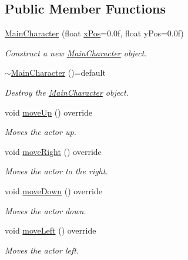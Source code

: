 \subsection*{Public Member Functions}
\begin{DoxyCompactItemize}
\item 
\mbox{\hyperlink{classRose_1_1Character_1_1MainCharacter_ad5de7cf93078abd4ee5439f29271517e}{Main\+Character}} (float \mbox{\hyperlink{classRose_1_1Character_1_1Actor_a0668a9c0c457d1c45e709b48111ba79d}{x\+Pos}}=0.\+0f, float y\+Pos=0.\+0f)
\begin{DoxyCompactList}\small\item\em Construct a new \mbox{\hyperlink{classRose_1_1Character_1_1MainCharacter}{Main\+Character}} object. \end{DoxyCompactList}\item 
\mbox{\hyperlink{classRose_1_1Character_1_1MainCharacter_ac608c6fc2c0b32d1fc93651939ee465e}{$\sim$\+Main\+Character}} ()=default
\begin{DoxyCompactList}\small\item\em Destroy the \mbox{\hyperlink{classRose_1_1Character_1_1MainCharacter}{Main\+Character}} object. \end{DoxyCompactList}\item 
void \mbox{\hyperlink{classRose_1_1Character_1_1MainCharacter_a9f967f5ad98eaae08948ab65bfd1a90b}{move\+Up}} () override
\begin{DoxyCompactList}\small\item\em Moves the actor up. \end{DoxyCompactList}\item 
void \mbox{\hyperlink{classRose_1_1Character_1_1MainCharacter_a08b5eae4f7ccabe74d1764993b0dcf91}{move\+Right}} () override
\begin{DoxyCompactList}\small\item\em Moves the actor to the right. \end{DoxyCompactList}\item 
void \mbox{\hyperlink{classRose_1_1Character_1_1MainCharacter_ac6a35f90921775e254bbb723998e84cd}{move\+Down}} () override
\begin{DoxyCompactList}\small\item\em Moves the actor down. \end{DoxyCompactList}\item 
void \mbox{\hyperlink{classRose_1_1Character_1_1MainCharacter_a80dd452d836ec63345c0afbfff664a7e}{move\+Left}} () override
\begin{DoxyCompactList}\small\item\em Moves the actor left. \end{DoxyCompactList}\item 

\end{DoxyCompactItemize}
